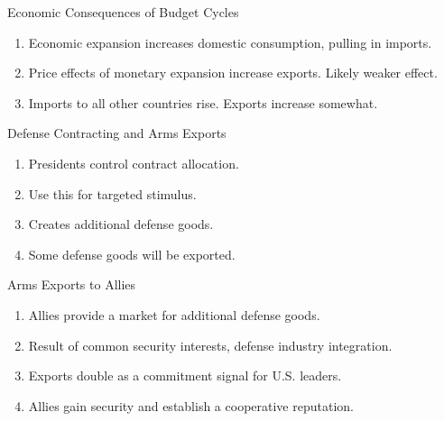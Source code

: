 \documentclass[12pt]{beamer}
\begin{document}

\begin{frame}{Economic Consequences of Budget Cycles}

\pause 
\begin{enumerate} 
\item Economic expansion increases domestic consumption, pulling in imports.  
\pause 
\item Price effects of monetary expansion increase exports. Likely weaker effect. 
\pause
\item Imports to all other countries rise. Exports increase somewhat. 
\end{enumerate}


\end{frame} 


\begin{frame}{Defense Contracting and Arms Exports}

\pause 
\begin{enumerate} 
\item Presidents control contract allocation.  
\pause 
\item Use this for targeted stimulus. 
\pause
\item Creates additional defense goods.
\pause
\item Some defense goods will be exported.
\end{enumerate}


\end{frame} 


\begin{frame}{Arms Exports to Allies}

\pause 
\begin{enumerate} 
\item Allies provide a market for additional defense goods.
\pause 
\item Result of common security interests, defense industry integration. 
\pause
\item Exports double as a commitment signal for U.S. leaders. 
\pause
\item Allies gain security and establish a cooperative reputation.
\end{enumerate}


\end{frame} 
\end{document}
